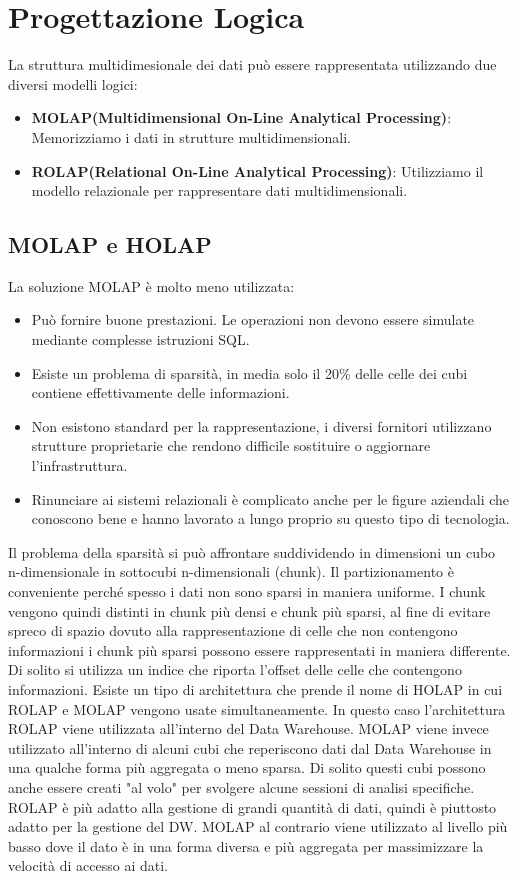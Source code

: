 \section{Progettazione Logica}
La struttura multidimesionale dei dati può essere rappresentata utilizzando due diversi modelli logici:
\begin{itemize}
	\item \textbf{MOLAP(Multidimensional On-Line Analytical Processing)}: Memorizziamo i dati in strutture multidimensionali.
	\item \textbf{ROLAP(Relational On-Line Analytical Processing)}: Utilizziamo il modello relazionale per rappresentare dati multidimensionali.
\end{itemize}
\subsection{MOLAP e HOLAP}
La soluzione MOLAP è molto meno utilizzata:
\begin{itemize}
	\item Può fornire buone prestazioni. Le operazioni non devono essere simulate mediante complesse istruzioni SQL.
	\item Esiste un problema di sparsità, in media solo il 20\% delle celle dei cubi contiene effettivamente delle informazioni.
	\item Non esistono standard per la rappresentazione, i diversi fornitori utilizzano strutture proprietarie che rendono difficile sostituire o aggiornare l'infrastruttura.
	\item Rinunciare ai sistemi relazionali è complicato anche per le figure aziendali che conoscono bene e hanno lavorato a lungo proprio su questo tipo di tecnologia.
\end{itemize}
Il problema della sparsità si può affrontare suddividendo in dimensioni un cubo n-dimensionale in sottocubi n-dimensionali (chunk). Il partizionamento è conveniente perché spesso i dati non sono sparsi in maniera uniforme. I chunk vengono quindi distinti in chunk più densi e chunk più sparsi, al fine di evitare spreco di spazio dovuto alla rappresentazione di celle che non contengono informazioni i chunk più sparsi possono essere rappresentati in maniera differente. Di solito si utilizza un indice che riporta l'offset delle celle che contengono informazioni.\newline\newline
Esiste un tipo di architettura che prende il nome di HOLAP in cui ROLAP e MOLAP vengono usate simultaneamente. In questo caso l'architettura ROLAP viene utilizzata all'interno del Data Warehouse. MOLAP viene invece utilizzato all'interno di alcuni cubi che reperiscono dati dal Data Warehouse in una qualche forma più aggregata o meno sparsa. Di solito questi cubi possono anche essere creati "al volo" per svolgere alcune sessioni di analisi specifiche. ROLAP è più adatto alla gestione di grandi quantità di dati, quindi è piuttosto adatto per la gestione del DW. MOLAP al contrario viene utilizzato al livello più basso dove il dato è in una forma diversa e più aggregata per massimizzare la velocità di accesso ai dati.\newline
{}

